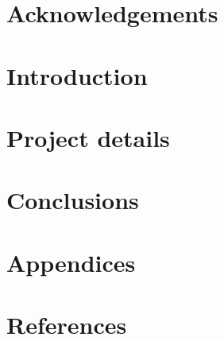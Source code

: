 \documentclass[12pt, a4paper, oneside, titlepage]{report}
\title{\printtitle}
\author{\printauthor}
\begin{document}
\makecover
\maketitlepage
\makeabstract

\chapter{Acknowledgements}


\newpage  %
\addtocounter{chapter}{1}
\tableofcontents

\chapter{Introduction}


\chapter{Project details}


\chapter{Conclusions}


\chapter{Appendices}


\chapter{References}


\printglossaries
\addtocounter{chapter}{1}
\end{document}
